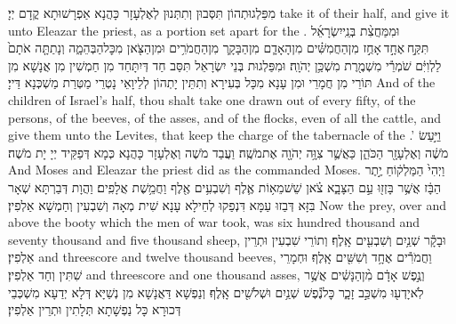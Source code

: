 {מִפַּלְגוּתְהוֹן תִּסְּבוּן וְתִתְּנוּן לְאֶלְעָזָר כָּהֲנָא אַפְרָשׁוּתָא קֳדָם יְיָ׃}
{take it of their half, and give it unto Eleazar the priest, as a portion set apart for the \lord.}{}
{וּמִמַּחֲצִ֨ת בְּנֵֽי\maqqaf יִשְׂרָאֵ֜ל תִּקַּ֣ח \legarmeh  אֶחָ֣ד \legarmeh  אָחֻ֣ז מִן\maqqaf הַחֲמִשִּׁ֗ים מִן\maqqaf הָאָדָ֧ם מִן\maqqaf הַבָּקָ֛ר מִן\maqqaf הַחֲמֹרִ֥ים וּמִן\maqqaf הַצֹּ֖אן מִכׇּל\maqqaf הַבְּהֵמָ֑ה וְנָתַתָּ֤ה אֹתָם֙ לַלְוִיִּ֔ם שֹׁמְרֵ֕י מִשְׁמֶ֖רֶת מִשְׁכַּ֥ן יְהֹוָֽה׃}
{וּמִפַּלְגוּת בְּנֵי יִשְׂרָאֵל תִּסַּב חַד דְּיִתָּחַד מִן חַמְשִׁין מִן אֲנָשָׁא מִן תּוֹרֵי מִן חֲמָרֵי וּמִן עָנָא מִכָּל בְּעִירָא וְתִתֵּין יָתְהוֹן לְלֵיוָאֵי נָטְרֵי מַטְּרַת מַשְׁכְּנָא דַּייָ׃}
{And of the children of Israel’s half, thou shalt take one drawn out of every fifty, of the persons, of the beeves, of the asses, and of the flocks, even of all the cattle, and give them unto the Levites, that keep the charge of the tabernacle of the \lord.’}{}
{וַיַּ֣עַשׂ מֹשֶׁ֔ה וְאֶלְעָזָ֖ר הַכֹּהֵ֑ן כַּאֲשֶׁ֛ר צִוָּ֥ה יְהֹוָ֖ה אֶת\maqqaf מֹשֶֽׁה׃}
{וַעֲבַד מֹשֶׁה וְאֶלְעָזָר כָּהֲנָא כְּמָא דְּפַקֵּיד יְיָ יָת מֹשֶׁה׃}
{And Moses and Eleazar the priest did as the \lord\space commanded Moses.}{}
{וַיְהִי֙ הַמַּלְק֔וֹחַ יֶ֣תֶר הַבָּ֔ז אֲשֶׁ֥ר בָּזְז֖וּ עַ֣ם הַצָּבָ֑א צֹ֗אן שֵׁשׁ\maqqaf מֵא֥וֹת אֶ֛לֶף וְשִׁבְעִ֥ים אֶ֖לֶף וַחֲמֵ֥שֶׁת אֲלָפִֽים׃}
{וַהֲוָת דְּבַרְתָּא שְׁאָר בִּזָּא דְּבַזוּ עַמָּא דִּנְפַקוּ לְחֵילָא עָנָא שִׁית מְאָה וְשִׁבְעִין וְחַמְשָׁא אַלְפִין׃}
{Now the prey, over and above the booty which the men of war took, was six hundred thousand and seventy thousand and five thousand sheep,}{}
{וּבָקָ֕ר שְׁנַ֥יִם וְשִׁבְעִ֖ים אָֽלֶף׃}
{וְתוֹרֵי שִׁבְעִין וּתְרֵין אַלְפִין׃}
{and threescore and twelve thousand beeves,}{}
{וַחֲמֹרִ֕ים אֶחָ֥ד וְשִׁשִּׁ֖ים אָֽלֶף׃}
{וּחְמָרֵי שִׁתִּין וְחַד אַלְפִין׃}
{and threescore and one thousand asses,}{}
{וְנֶ֣פֶשׁ אָדָ֔ם מִ֨ן\maqqaf הַנָּשִׁ֔ים אֲשֶׁ֥ר לֹֽא\maqqaf יָדְע֖וּ מִשְׁכַּ֣ב זָכָ֑ר כׇּל\maqqaf נֶ֕פֶשׁ שְׁנַ֥יִם וּשְׁלֹשִׁ֖ים אָֽלֶף׃}
{וְנַפְשָׁא דַּאֲנָשָׁא מִן נְשַׁיָּא דְּלָא יְדַעָא מִשְׁכְּבֵי דְּכוּרָא כָּל נַפְשָׁתָא תְּלָתִין וּתְרֵין אַלְפִין׃}
